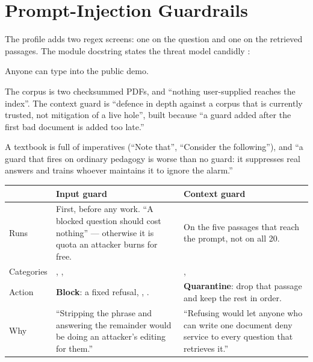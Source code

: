 \chapter{Prompt-Injection Guardrails}
\label{ch:guardrails}

The  profile adds two regex screens: one on the question and one on the retrieved passages. The module docstring states the threat model candidly :
\begin{description}[style=nextline]
  \item[User input is genuinely untrusted.] Anyone can type into the public demo.
  \item[Retrieved context is the less real threat here.] The corpus is two checksummed PDFs, and ``nothing user-supplied reaches the index''. The context guard is ``defence in depth against a corpus that is currently trusted, not mitigation of a live hole'', built because ``a guard added after the first bad document is added too late.''
  \item[The design constraint is false positives.] A textbook is full of imperatives (``Note that'', ``Consider the following''), and ``a guard that fires on ordinary pedagogy is worse than no guard: it suppresses real answers and trains whoever maintains it to ignore the alarm.''
\end{description}

\begin{center}\small
\begin{tabularx}{\textwidth}{@{}>{\raggedright\arraybackslash}p{2.4cm}LL@{}}
\toprule
& \textbf{Input guard} & \textbf{Context guard}\\
\midrule
Runs & First, before any work. ``A blocked question should cost nothing'' --- otherwise it is quota an attacker burns for free. & On the five passages that reach the prompt, not on all 20.\\
Categories & , ,  & , \\
Action & \textbf{Block}: a fixed refusal, , . & \textbf{Quarantine}: drop that passage and keep the rest in order.\\
Why & ``Stripping the phrase and answering the remainder would be doing an attacker's editing for them.'' & ``Refusing would let anyone who can write one document deny service to every question that retrieves it.''\\
\bottomrule
\end{tabularx}
\end{center}

